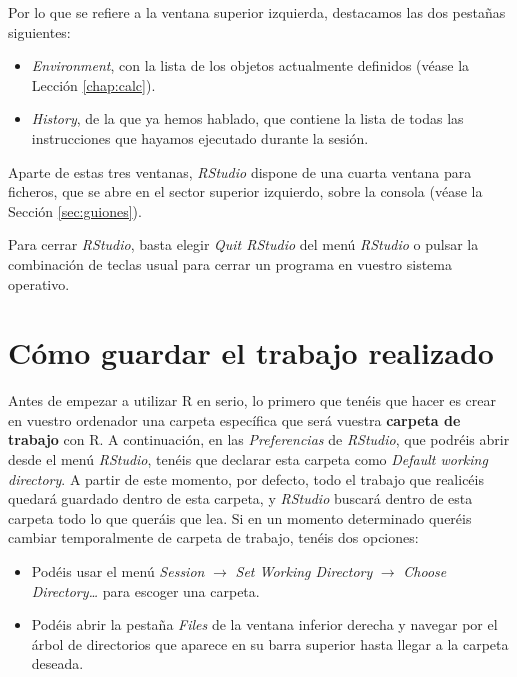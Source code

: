 \documentclass[]{book}
\providecommand{\tightlist}{%
  \setlength{\itemsep}{0pt}\setlength{\parskip}{0pt}}
\theoremstyle{definition}
\theoremstyle{definition}
\theoremstyle{definition}
\theoremstyle{remark}
\begin{document}
Por lo que se refiere a la ventana superior izquierda, destacamos las dos pestañas siguientes:

\begin{itemize}
\tightlist
\item
  \emph{Environment}, con la lista de los objetos actualmente definidos (véase la Lección \ref{chap:calc}).
\item
  \emph{History}, de la que ya hemos hablado, que contiene la lista de todas las instrucciones que hayamos ejecutado durante la sesión.
\end{itemize}

Aparte de estas tres ventanas, \emph{RStudio} dispone de una cuarta ventana para ficheros, que se abre en el sector superior izquierdo, sobre la consola (véase la Sección \ref{sec:guiones}).

Para cerrar \emph{RStudio}, basta elegir \emph{Quit RStudio} del menú \emph{RStudio} o
pulsar la combinación de teclas usual para cerrar un programa en vuestro sistema operativo.

\hypertarget{sec:guardar}{%
\section{Cómo guardar el trabajo realizado}\label{sec:guardar}}

Antes de empezar a utilizar R en serio, lo primero que tenéis que hacer es crear en vuestro ordenador una carpeta específica que será vuestra \textbf{carpeta de trabajo} con R. A continuación, en las \emph{Preferencias} de \emph{RStudio}, que podréis abrir desde el menú \emph{RStudio}, tenéis que declarar esta carpeta como \emph{Default working directory}. A partir de este momento, por defecto, todo el trabajo que realicéis quedará guardado dentro de esta carpeta, y \emph{RStudio} buscará dentro de esta carpeta todo lo que queráis que lea.
Si en un momento determinado queréis cambiar temporalmente de carpeta de trabajo, tenéis dos opciones:

\begin{itemize}
\item
  Podéis usar el menú \emph{Session} \(\rightarrow\) \emph{Set Working Directory} \(\rightarrow\) \emph{Choose Directory\ldots{}} para escoger una carpeta.
\item
  Podéis abrir la pestaña \emph{Files} de la ventana inferior derecha y navegar por el árbol de directorios que aparece en su barra superior hasta llegar a la carpeta deseada.
\end{itemize}
\end{document}

